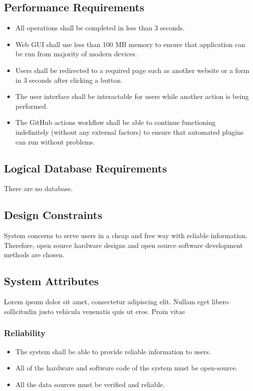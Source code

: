 \documentclass[a4paper]{article}
\begin{document}
        \subsection{Performance Requirements}

        \begin{itemize}
            \item All operations shall be completed in less than 3 seconds.
            \item Web GUI shall use less than 100 MB memory to ensure that application can be run from majority of modern devices.
            \item Users shall be redirected to a required page such as another website or a form in 3 seconds after clicking a button.
            \item The user interface shall be interactable for users while another action is being performed.
            \item The GitHub actions workflow shall be able to continue functioning indefinitely (without any external factors) to ensure
            that automated plugins can run without problems.
        \end{itemize}

        \subsection{Logical Database Requirements}


        There are no database.

        \subsection{Design Constraints}

        System concerns to serve users in a cheap and free way with reliable information. Therefore, open source hardware designs
        and open source software development methods are chosen.

        \subsection{System Attributes}

        Lorem ipsum dolor sit amet, consectetur adipiscing elit. Nullam eget libero sollicitudin justo vehicula venenatis quis ut eros. Proin vitae
        
            \subsubsection{Reliability}
            \begin{itemize}
                \item The system shall be able to provide reliable information to users.
                \item All of the hardware and software code of the system must be open-source.
                \item All the data sources must be verified and reliable.
            \end{itemize}
\end{document}
